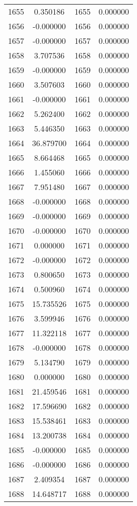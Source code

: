 \documentclass[12pt]{article}
\begin{document}
\begin{longtable}{@{}cccc@{}}
1655 & 0.350186 & 1655 & 0.000000 \\
1656 & -0.000000 & 1656 & 0.000000 \\
1657 & -0.000000 & 1657 & 0.000000 \\
1658 & 3.707536 & 1658 & 0.000000 \\
1659 & -0.000000 & 1659 & 0.000000 \\
1660 & 3.507603 & 1660 & 0.000000 \\
1661 & -0.000000 & 1661 & 0.000000 \\
1662 & 5.262400 & 1662 & 0.000000 \\
1663 & 5.446350 & 1663 & 0.000000 \\
1664 & 36.879700 & 1664 & 0.000000 \\
1665 & 8.664468 & 1665 & 0.000000 \\
1666 & 1.455060 & 1666 & 0.000000 \\
1667 & 7.951480 & 1667 & 0.000000 \\
1668 & -0.000000 & 1668 & 0.000000 \\
1669 & -0.000000 & 1669 & 0.000000 \\
1670 & -0.000000 & 1670 & 0.000000 \\
1671 & 0.000000 & 1671 & 0.000000 \\
1672 & -0.000000 & 1672 & 0.000000 \\
1673 & 0.800650 & 1673 & 0.000000 \\
1674 & 0.500960 & 1674 & 0.000000 \\
1675 & 15.735526 & 1675 & 0.000000 \\
1676 & 3.599946 & 1676 & 0.000000 \\
1677 & 11.322118 & 1677 & 0.000000 \\
1678 & -0.000000 & 1678 & 0.000000 \\
1679 & 5.134790 & 1679 & 0.000000 \\
1680 & 0.000000 & 1680 & 0.000000 \\
1681 & 21.459546 & 1681 & 0.000000 \\
1682 & 17.596690 & 1682 & 0.000000 \\
1683 & 15.538461 & 1683 & 0.000000 \\
1684 & 13.200738 & 1684 & 0.000000 \\
1685 & -0.000000 & 1685 & 0.000000 \\
1686 & -0.000000 & 1686 & 0.000000 \\
1687 & 2.409354 & 1687 & 0.000000 \\
1688 & 14.648717 & 1688 & 0.000000 \\

\end{longtable}
\end{document}
